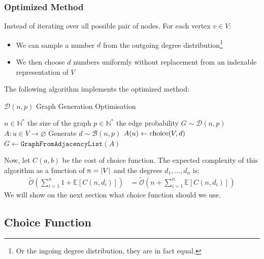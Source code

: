 \subsubsection{Optimized Method}
Instead of iterating over all possible pair of nodes. For each vertex $v\in V$:
\begin{itemize}
	\item We can sample a number $d$ from the outgoing degree distribution\footnote{Or the ingoing degree distribution, they are in fact equal.}
	\item We then choose $d$ numbers uniformly without replacement from an indexable representation of $V$
\end{itemize}
The following algorithm implements the optimized method:
\begin{algorithm}
	\caption{$\mathcal{D}(n,p)$ Graph Generation Optimisation}\label{alg:Dnp_Fast}
	\begin{algorithmic}
		\Require $n\in\mathbb{N}^*$ the size of the graph
		\Require $p\in\mathbb{N}^*$ the edge probability 
		\Ensure $G\sim \mathcal{D}(n,p)$  
		\State $A:u\in V\rightarrow \varnothing$
		\State Generate $d\sim \mathcal{B}(n,p)$
		\State $A(u)\leftarrow \operatorname{choice}(V,d)$
		\EndFor
		\State \Return $G\leftarrow \texttt{GraphFromAdjacencyList}(A)$
	\end{algorithmic}
\end{algorithm}
\FloatBarrier
Now, let $C(a,b)$ be the cost of choice function. 
\newline The expected complexity of this algorithm as a function of $n=\lvert V \rvert$ and the degrees $d_1,\dots,d_n$ is:
\begin{align}
	\label{eqn:DnpBigO}
	\tilde{\mathcal{O}}\left(\sum_{i=1}^n1+\mathbb{E}[C(n,d_i)]\right) &= 	\tilde{\mathcal{O}}\left(n+\sum_{i=1}^n\mathbb{E}[C(n,d_i)]\right) 
\end{align}
We will show on the next section what choice function should we use.
\subsection{Choice Function}
